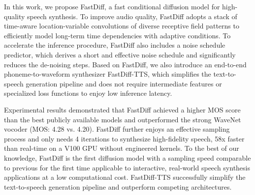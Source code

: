 In this work, we propose FastDiff, a fast conditional diffusion model for high-quality speech synthesis. To improve audio quality, FastDiff adopts a stack of time-aware location-variable convolutions of diverse receptive field patterns to efficiently model long-term time dependencies with adaptive conditions. To accelerate the inference procedure, FastDiff also includes a noise schedule predictor, which derives a short and effective noise schedule and significantly reduces the de-noising steps. Based on FastDiff, we also introduce an end-to-end phoneme-to-waveform synthesizer FastDiff-TTS, which simplifies the text-to-speech generation pipeline and does not require intermediate features or specialized loss functions to enjoy low inference latency.

Experimental results demonstrated that FastDiff achieved a higher MOS score than the best publicly available models and outperformed the strong WaveNet vocoder (MOS: 4.28 vs. 4.20). FastDiff further enjoys an effective sampling process and only needs 4 iterations to synthesize high-fidelity speech, 58x faster than real-time on a V100 GPU without engineered kernels. To the best of our knowledge, FastDiff is the first diffusion model with a sampling speed comparable to previous  for the first time applicable to interactive, real-world speech synthesis applications at a low computational cost. FastDiff-TTS successfully simplify the text-to-speech generation pipeline and outperform competing architectures.